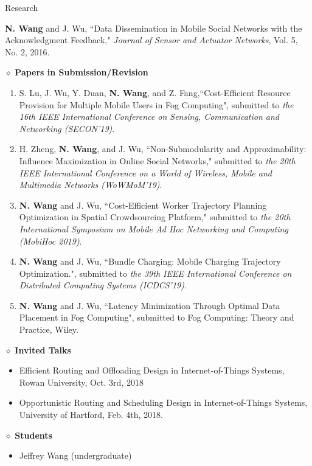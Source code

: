 \documentclass{resume} %
\begin{document}
\begin{rSection}{Research}
\begin{enumerate}[{J}1.]
{\item {{\bf N. Wang} and J. Wu, ``{Data Dissemination in Mobile Social Networks with the Acknowledgment Feedback},"} \textit{Journal of Sensor and Actuator Networks}, Vol. 5, No. 2, 2016.}
\end{enumerate}


\item $\diamond$ {\bf Papers in Submission/Revision}
\begin{enumerate}[{N}1.] \setlength{\itemsep}{-5pt}
\item  S. Lu, J. Wu, Y. Duan, {\bf N. Wang}, and Z. Fang,``Cost-Efficient Resource Provision for Multiple Mobile Users in Fog Computing", submitted to  \textit{the 16th IEEE  International Conference on Sensing, Communication and Networking (SECON'19)}.
\item H. Zheng,  {{\bf N. Wang}, and J. Wu,  ``Non-Submodularity and Approximability: Influence Maximization in Online Social Networks,"} submitted to \textit{the 20th IEEE International Conference on a World of Wireless, Mobile and Multimedia Networks (WoWMoM'19)}.
\item {{\bf N. Wang} and  J. Wu, ``Cost-Efficient Worker Trajectory Planning Optimization in Spatial Crowdsourcing Platform,"} submitted to \textit{the 20th International Symposium on Mobile Ad Hoc Networking and Computing (MobiHoc 2019)}.
\item {{\bf N. Wang} and J. Wu, ``Bundle Charging: Mobile Charging Trajectory Optimization."},  submitted to \textit{the 39th IEEE International Conference on Distributed Computing Systems (ICDCS'19)}. 
\item {\bf N. Wang} and J. Wu,  ``Latency Minimization Through Optimal Data Placement in Fog Computing", submitted to  Fog Computing: Theory and Practice, Wiley.
\end{enumerate}


\item $\diamond$ {\bf Invited Talks}
\begin{itemize}
    \item Efficient Routing and Offloading Design in Internet-of-Things Systems, Rowan University, Oct. 3rd, 2018
    \item Opportunistic Routing and Scheduling Design in Internet-of-Things Systems, University of Hartford, Feb. 4th, 2018.
\end{itemize}


\item $\diamond$ {\bf Students}
\begin{itemize}
    \item  Jeffrey Wang (undergraduate)
\end{itemize}

\end{rSection}
\end{document}
